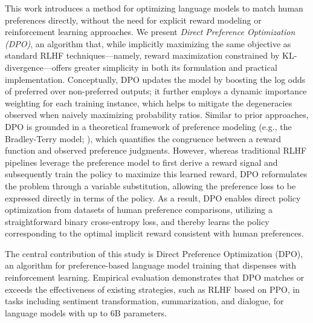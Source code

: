 This work introduces a method for optimizing language models to match human preferences directly, without the need for explicit reward modeling or reinforcement learning approaches. We present \textit{{Direct Preference Optimization} (DPO)}, an algorithm that, while implicitly maximizing the same objective as standard RLHF techniques—namely, reward maximization constrained by KL-divergence—offers greater simplicity in both its formulation and practical implementation. Conceptually, DPO updates the model by boosting the log odds of preferred over non-preferred outputs; it further employs a dynamic importance weighting for each training instance, which helps to mitigate the degeneracies observed when naively maximizing probability ratios. Similar to prior approaches, DPO is grounded in a theoretical framework of preference modeling (e.g., the Bradley-Terry model; \cite{bradley1952rankanalysis}), which quantifies the congruence between a reward function and observed preference judgments. However, whereas traditional RLHF pipelines leverage the preference model to first derive a reward signal and subsequently train the policy to maximize this learned reward, DPO reformulates the problem through a variable substitution, allowing the preference loss to be expressed directly in terms of the policy. As a result, DPO enables direct policy optimization from datasets of human preference comparisons, utilizing a straightforward binary cross-entropy loss, and thereby learns the policy corresponding to the optimal implicit reward consistent with human preferences.

The central contribution of this study is Direct Preference Optimization (DPO), an algorithm for preference-based language model training that dispenses with reinforcement learning. Empirical evaluation demonstrates that DPO matches or exceeds the effectiveness of existing strategies, such as RLHF based on PPO, in tasks including sentiment transformation, summarization, and dialogue, for language models with up to 6B parameters.

